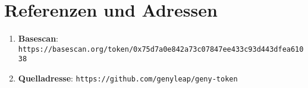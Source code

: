 \documentclass[a4paper,12pt,openany]{book}
\begin{document}
\section*{Referenzen und Adressen}

\begin{enumerate}
    \item \textbf{Basescan}: \texttt{https://basescan.org/token/0x75d7a0e842a73c07847ee433c93d443dfea61038}
    \item \textbf{Quelladresse}: \texttt{https://github.com/genyleap/geny-token}
\end{enumerate}
\end{document}
